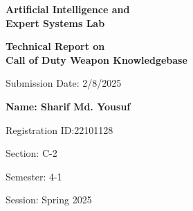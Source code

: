 \documentclass[12pt,a4paper]{article}
\begin{document}
\begin{titlepage}
    \centering

    \vspace*{2cm}
    {\Huge\bfseries\color{white}
        \colorbox{cse404green}{}
    }

    \vspace{1cm}

    {\Huge\bfseries\color{orangetitle}
        Artificial Intelligence and\\
        Expert Systems Lab
    }

    \vspace{2cm}

    {\Large\bfseries\color{tealblue}
        Technical Report on \\ Call of Duty Weapon Knowledgebase
    }

    \vspace{0.5cm}

    {\large\color{bluepurple}
        Submission Date: 2/8/2025
    }

    \vspace{3cm}

    \begin{minipage}[t]{0.45\textwidth}
        \centering
        {\Large\bfseries\color{white}
            \colorbox{bluepurple}{}
        }

        \vspace{0.5cm}

        {\large\bfseries Name: Sharif Md. Yousuf}

        \vspace{0.3cm}

        {\large Registration ID:\@ 22101128}

        \vspace{0.3cm}

        {\large Section: C-2}

        \vspace{0.3cm}

        {\large Semester: 4-1}

        \vspace{0.3cm}

        {\large Session: Spring 2025}
    \end{minipage}
    \hfill
    \begin{minipage}[t]{0.45\textwidth}
        \centering
        {\Large\bfseries\color{white}
            \colorbox{tealblue}{}
        }


\end{minipage}
\end{titlepage}
\end{document}
